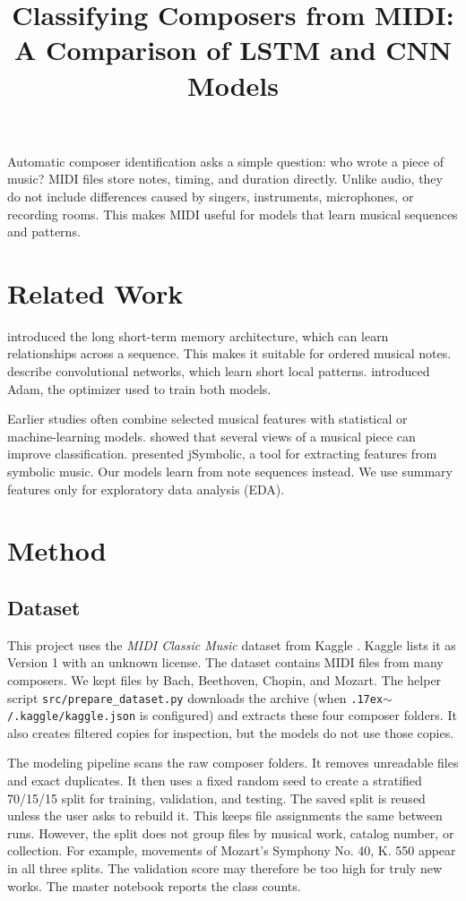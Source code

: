 \documentclass[stu, floatsintext]{apa7}
\title{Classifying Composers from MIDI: A Comparison of LSTM and CNN Models}
\begin{document}
\maketitle

Automatic composer identification asks a simple question: who wrote a piece of
music? MIDI files store notes, timing, and duration directly. Unlike audio, they
do not include differences caused by singers, instruments, microphones, or
recording rooms. This makes MIDI useful for models that learn musical sequences
and patterns.

\section{Related Work}
\textcite{Hochreiter1997} introduced the long short-term memory architecture,
which can learn relationships across a sequence. This makes it suitable for
ordered musical notes. \textcite{LeCun2015} describe convolutional networks,
which learn short local patterns. \textcite{Kingma2015} introduced Adam, the
optimizer used to train both models.

Earlier studies often combine selected musical features with statistical or
machine-learning models. \textcite{Conklin2013} showed that several views of a
musical piece can improve classification. \textcite{McKay2018} presented
jSymbolic, a tool for extracting features from symbolic music. Our models learn
from note sequences instead. We use summary features only for exploratory data
analysis (EDA).

\section{Method}

\subsection{Dataset}
This project uses the \textit{MIDI Classic Music} dataset from Kaggle
\parencite{FedorakND}. Kaggle lists it as Version 1 with an unknown license. The
dataset contains MIDI files from many composers. We kept files by Bach,
Beethoven, Chopin, and Mozart. The helper script
\texttt{src/prepare\_dataset.py} downloads the archive (when
\texttt{{\raise.17ex\hbox{$\scriptstyle\sim$}}/.kaggle/kaggle.json} is
configured) and extracts these four composer folders. It also creates filtered
copies for inspection, but the models do not use those copies.

The modeling pipeline scans the raw composer folders. It removes unreadable files
and exact duplicates. It then uses a fixed random seed to create a stratified
70/15/15 split for training, validation, and testing. The saved split is reused
unless the user asks to rebuild it. This keeps file assignments the same between
runs. However, the split does not group files by musical work, catalog number,
or collection. For example, movements of Mozart's Symphony No. 40, K. 550 appear
in all three splits. The validation score may therefore be too high for truly
new works. The master notebook reports the class counts.
\end{document}

